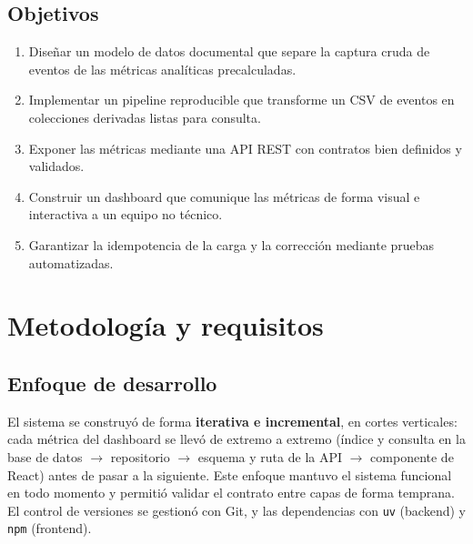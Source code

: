 \documentclass[12pt, letterpaper]{article}
\newcommand{\code}[1]{\texttt{#1}}
\begin{document}
\subsection{Objetivos}
\begin{enumerate}[leftmargin=*]
  \item Diseñar un modelo de datos documental que separe la captura cruda de
        eventos de las métricas analíticas precalculadas.
  \item Implementar un pipeline reproducible que transforme un CSV de eventos
        en colecciones derivadas listas para consulta.
  \item Exponer las métricas mediante una API REST con contratos bien definidos
        y validados.
  \item Construir un dashboard que comunique las métricas de forma visual e
        interactiva a un equipo no técnico.
  \item Garantizar la idempotencia de la carga y la corrección mediante pruebas
        automatizadas.
\end{enumerate}

\section{Metodología y requisitos}
\subsection{Enfoque de desarrollo}
El sistema se construyó de forma \textbf{iterativa e incremental}, en cortes
verticales: cada métrica del dashboard se llevó de extremo a extremo (índice y
consulta en la base de datos $\rightarrow$ repositorio $\rightarrow$ esquema y
ruta de la API $\rightarrow$ componente de React) antes de pasar a la siguiente.
Este enfoque mantuvo el sistema funcional en todo momento y permitió validar el
contrato entre capas de forma temprana. El control de versiones se gestionó con
Git, y las dependencias con \code{uv} (backend) y \code{npm} (frontend).
\end{document}
